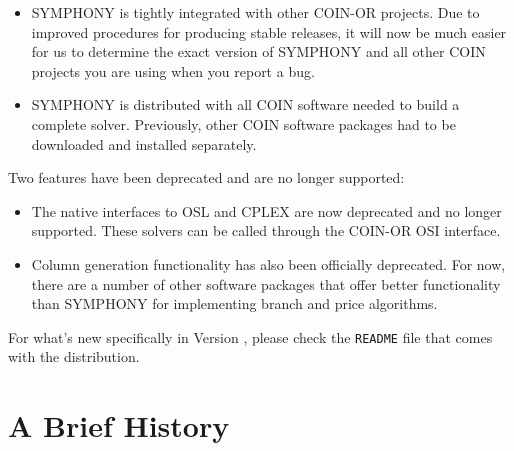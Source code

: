 \begin{itemize}
\begin{itemize}
\item SYMPHONY is tightly integrated with other COIN-OR projects. Due
  to improved procedures for producing stable releases, it will now be much
  easier for us to determine the exact version of SYMPHONY and all other COIN
  projects you are using when you report a bug.

\item SYMPHONY is distributed with all COIN software needed to build a
  complete solver. Previously, other COIN software packages had to be
  downloaded and installed separately.

\end{itemize}

\end{itemize}

Two features have been deprecated and are no longer supported:

\begin{itemize}

\item The native interfaces to OSL and CPLEX are now deprecated and no longer
supported. These solvers can be called through the COIN-OR OSI interface.

\item Column generation functionality has also been officially deprecated. For
now, there are a number of other software packages that offer better
functionality than SYMPHONY for implementing branch and price algorithms.

\end{itemize}

For what's new specifically in Version \VER, please check the \texttt{README}
file that comes with the distribution.

\section{A Brief History}
\label{history}

